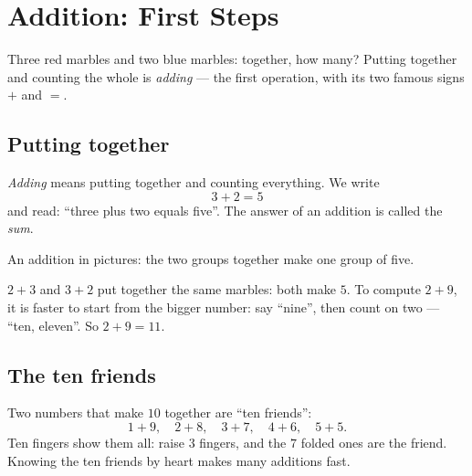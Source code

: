 \chapter{Addition: First Steps}\label{ch:g1:addition}

Three red marbles and two blue marbles: together, how many? Putting
together and counting the whole is \emph{adding} --- the first
operation, with its two famous signs $+$ and $=$.

\section{Putting together}

\begin{definition}[Addition]\label{def:g1:addition:def}
\emph{Adding} means putting together and counting everything. We
write
\[
3 + 2 = 5
\]
and read: ``three plus two equals five''. The answer of an addition
is called the \emph{sum}.
\end{definition}

\begin{omfigure}

{\small An addition in pictures: the two groups together make one
group of five.}
\end{omfigure}

\begin{example}\label{ex:g1:addition:order}
$2 + 3$ and $3 + 2$ put together the same marbles: both make $5$.
To compute $2 + 9$, it is faster to start from the bigger number:
say ``nine'', then count on two --- ``ten, eleven''. So
$2 + 9 = 11$.
\end{example}

\section{The ten friends}

\begin{example}[Complements to 10]\label{ex:g1:addition:friends}
Two numbers that make $10$ together are ``ten friends'':
\[
1 + 9, \quad 2 + 8, \quad 3 + 7, \quad 4 + 6, \quad 5 + 5 .
\]
Ten fingers show them all: raise $3$ fingers, and the $7$ folded
ones are the friend. Knowing the ten friends by heart makes many
additions fast.
\end{example}

